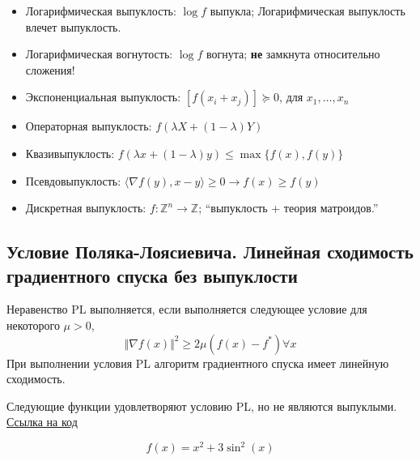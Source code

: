 \documentclass[
  russian,
  letterpaper,
  DIV=11,
  numbers=noendperiod]{scrartcl}
\providecommand{\tightlist}{%
  \setlength{\itemsep}{0pt}\setlength{\parskip}{0pt}}
\begin{document}
\begin{itemize}
\tightlist
\item
  Логарифмическая выпуклость: \(\log f\) выпукла; Логарифмическая
  выпуклость влечет выпуклость.
\item
  Логарифмическая вогнутость: \(\log f\) вогнута; \textbf{не} замкнута
  относительно сложения!
\item
  Экспоненциальная выпуклость: \([f(x_i + x_j)] \succeq 0\), для
  \(x_1, \ldots, x_n\)
\item
  Операторная выпуклость: \(f(\lambda X + (1 - \lambda )Y)\)
\item
  Квазивыпуклость:
  \(f(\lambda x + (1 - \lambda) y) \leq \max \{f(x), f(y)\}\)
\item
  Псевдовыпуклость:
  \(\langle \nabla f(y), x - y \rangle \geq 0 \longrightarrow f(x) \geq f(y)\)
\item
  Дискретная выпуклость: \(f : \mathbb{Z}^n \to \mathbb{Z}\);
  ``выпуклость + теория матроидов.''
\end{itemize}

\subsection{Условие Поляка-Лоясиевича. Линейная сходимость градиентного
спуска без
выпуклости}\label{ux443ux441ux43bux43eux432ux438ux435-ux43fux43eux43bux44fux43aux430-ux43bux43eux44fux441ux438ux435ux432ux438ux447ux430.-ux43bux438ux43dux435ux439ux43dux430ux44f-ux441ux445ux43eux434ux438ux43cux43eux441ux442ux44c-ux433ux440ux430ux434ux438ux435ux43dux442ux43dux43eux433ux43e-ux441ux43fux443ux441ux43aux430-ux431ux435ux437-ux432ux44bux43fux443ux43aux43bux43eux441ux442ux438}

Неравенство PL выполняется, если выполняется следующее условие для
некоторого \(\mu > 0\), \[
\Vert \nabla f(x) \Vert^2 \geq 2\mu (f(x) - f^*) \forall x
\] При выполнении условия PL алгоритм градиентного спуска имеет линейную
сходимость.

Следующие функции удовлетворяют условию PL, но не являются выпуклыми.
\href{https://colab.research.google.com/github/MerkulovDaniil/optim/blob/master/assets/Notebooks/PL_function.ipynb}{\faPython Ссылка
на код}

\[
f(x) = x^2 + 3\sin^2(x)
\]
\end{document}
